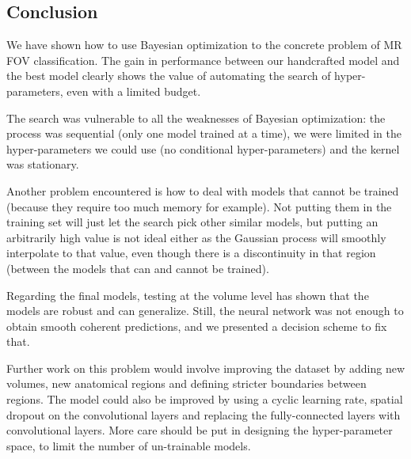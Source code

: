 \subsection{Conclusion}

We have shown how to use Bayesian optimization to the concrete problem of MR FOV classification. The gain in performance between our handcrafted model and the best model clearly shows the value of automating the search of hyper-parameters, even with a limited budget.

The search was vulnerable to all the weaknesses of Bayesian optimization: the process was sequential (only one model trained at a time), we were limited in the hyper-parameters we could use (no conditional hyper-parameters) and the kernel was stationary. 

Another problem encountered is how to deal with models that cannot be trained (because they require too much memory for example). Not putting them in the training set will just let the search pick other similar models, but putting an arbitrarily high value is not ideal either as the Gaussian process will smoothly interpolate to that value, even though there is a discontinuity in that region (between the models that can and cannot be trained).

Regarding the final models, testing at the volume level has shown that the models are robust and can generalize. Still, the neural network was not enough to obtain smooth coherent predictions, and we presented a decision scheme to fix that.

Further work on this problem would involve improving the dataset by adding new volumes, new anatomical regions and defining stricter boundaries between regions. The model could also be improved by using a cyclic learning rate, spatial dropout on the convolutional layers and replacing the fully-connected layers with convolutional layers. More care should be put in designing the hyper-parameter space, to limit the number of un-trainable models.


